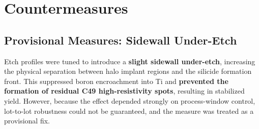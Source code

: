 \documentclass[conference]{IEEEtran}
\begin{document}
\section{Countermeasures}
\subsection{Provisional Measures: Sidewall Under-Etch}
Etch profiles were tuned to introduce a \textbf{slight sidewall under-etch},
increasing the physical separation between halo implant regions and the
silicide formation front. This suppressed boron encroachment into Ti
and \textbf{prevented the formation of residual C49 high-resistivity
spots}, resulting in stabilized yield. However, because the effect
depended strongly on process-window control, lot-to-lot robustness
could not be guaranteed, and the measure was treated as a provisional fix.
\end{document}
